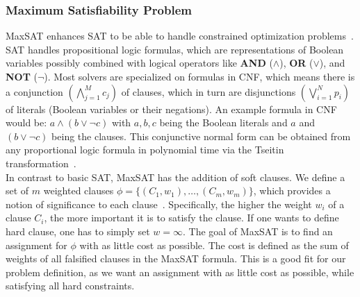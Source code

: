 \subsubsection{Maximum Satisfiability Problem}
\ac{MaxSAT} enhances \ac{SAT} to be able to handle constrained optimization problems~\cite{bib:2013-ansotegui}. \ac{SAT} handles propositional logic formulas, which are representations of Boolean variables possibly combined with logical operators like \textbf{AND} ($\land$), \textbf{OR} ($\lor$), and \textbf{NOT} ($\lnot$). Most solvers are specialized on formulas in \ac{CNF}, which means there is a conjunction $\left( \bigwedge_{j=1}^M c_j \right)$ of clauses, which in turn are disjunctions $\left( \bigvee_{i=1}^N p_i \right)$ of literals (Boolean variables or their negations). An example formula in \ac{CNF} would be: $a \land (b \lor \lnot c)$ with $a, b, c$ being the Boolean literals and $a$ and $(b \lor \lnot c)$ being the clauses. This conjunctive normal form can be obtained from any proportional logic formula in polynomial time via the Tseitin transformation~\cite{bib:1983-tseitin}. \\
In contrast to basic \ac{SAT}, \ac{MaxSAT} has the addition of soft clauses. We define a set of $m$ weighted clauses $\phi = \{(C_1, w_1), \dots, (C_m, w_m)\}$, which provides a notion of significance to each clause~\cite{bib:2013-ansotegui}. Specifically, the higher the weight $w_i$ of a clause $C_i$, the more important it is to satisfy the clause. If one wants to define hard clause, one has to simply set $w = \infty$. The goal of \ac{MaxSAT} is to find an assignment for $\phi$ with as little cost as possible. The cost is defined as the sum of weights of all falsified clauses in the \ac{MaxSAT} formula. This is a good fit for our problem definition, as we want an assignment with as little cost as possible, while satisfying all hard constraints.

